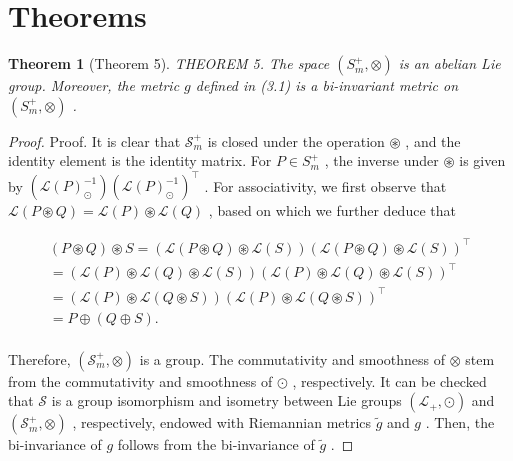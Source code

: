 \documentclass[11pt]{article}
\newtheorem{theorem}{Theorem}
\begin{document}
\section*{Theorems}

\begin{theorem}[Theorem 5]
THEOREM 5. The space  $(S_m^+, \otimes)$  is an abelian Lie group. Moreover, the metric  $g$  defined in (3.1) is a bi-invariant metric on  $(S_m^+, \otimes)$ .
\end{theorem}

\begin{proof}
Proof. It is clear that  $\mathcal{S}_m^+$  is closed under the operation  $\circledast$ , and the identity element is the identity matrix. For  $P \in S_m^+$ , the inverse under  $\circledast$  is given by  $(\mathcal{L}(P)_{\odot}^{-1})(\mathcal{L}(P)_{\odot}^{-1})^\top$ . For associativity, we first observe that  $\mathcal{L}(P \circledast Q) = \mathcal{L}(P) \circledast \mathcal{L}(Q)$ , based on which we further deduce that

$$
\begin{array}{l} (P \circledast Q) \circledast S = (\mathcal {L} (P \circledast Q) \circledast \mathcal {L} (S)) (\mathcal {L} (P \circledast Q) \circledast \mathcal {L} (S)) ^ {\top} \\ = (\mathcal {L} (P) \circledast \mathcal {L} (Q) \circledast \mathcal {L} (S)) (\mathcal {L} (P) \circledast \mathcal {L} (Q) \circledast \mathcal {L} (S)) ^ {\top} \\ = (\mathcal {L} (P) \circledast \mathcal {L} (Q \circledast S)) (\mathcal {L} (P) \circledast \mathcal {L} (Q \circledast S)) ^ {\top} \\ = P \oplus (Q \oplus S). \\ \end{array}
$$

Therefore,  $(\mathcal{S}_m^+, \otimes)$  is a group. The commutativity and smoothness of  $\otimes$  stem from the commutativity and smoothness of  $\odot$ , respectively. It can be checked that  $\mathcal{S}$  is a group isomorphism and isometry between Lie groups  $(\mathcal{L}_+, \odot)$  and  $(\mathcal{S}_m^+, \otimes)$ , respectively, endowed with Riemannian metrics  $\tilde{g}$  and  $g$ . Then, the bi-invariance of  $g$  follows from the bi-invariance of  $\tilde{g}$ .


\end{proof}
\end{document}
